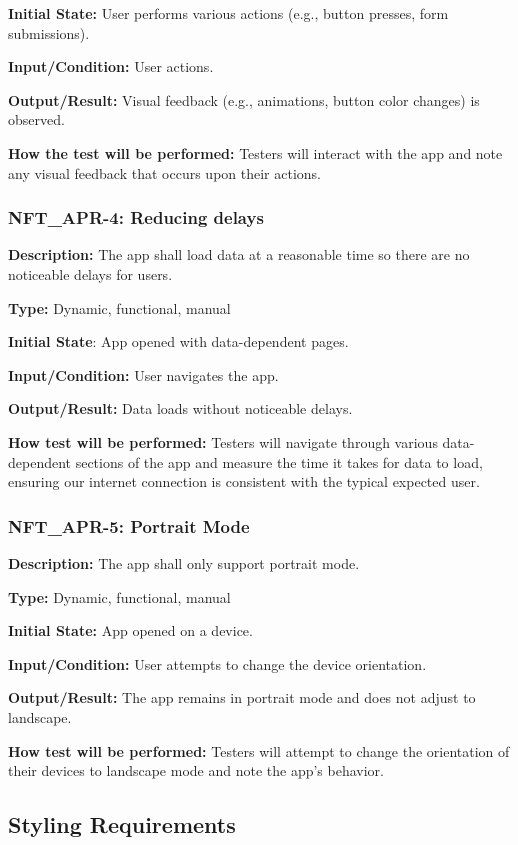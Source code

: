 \documentclass[12pt, titlepage]{article}
\begin{document}
\textbf{Initial State:} User performs various actions (e.g., button presses, form submissions).

\textbf{Input/Condition: }User actions.

\textbf{Output/Result:} Visual feedback (e.g., animations, button color changes) is observed.

\textbf{How the test will be performed:} Testers will interact with the app and note any visual feedback that occurs upon their actions.


\subsubsection*{\textbf{NFT\_APR-4: Reducing delays}}


\textbf{Description: }The app shall load data at a reasonable time so there are no noticeable delays for users.

\textbf{Type:} Dynamic, functional, manual

\textbf{Initial State}: App opened with data-dependent pages.

\textbf{Input/Condition: }User navigates the app.

\textbf{Output/Result:} Data loads without noticeable delays.

\textbf{How test will be performed: }Testers will navigate through various data-dependent sections of the app and measure the time it takes for data to load, ensuring our internet connection is consistent with the typical expected user. 


\subsubsection*{\textbf{NFT\_APR-5: Portrait Mode}}


\textbf{Description:} The app shall only support portrait mode.

\textbf{Type: }Dynamic, functional, manual

\textbf{Initial State:} App opened on a device.

\textbf{Input/Condition:} User attempts to change the device orientation.

\textbf{Output/Result: }The app remains in portrait mode and does not adjust to landscape.

\textbf{How test will be performed:} Testers will attempt to change the orientation of their devices to landscape mode and note the app's behavior.
\newline
\subsection{Styling Requirements}
\end{document}
